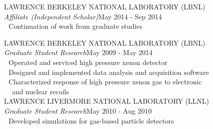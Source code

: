\indent\hspace{0.2 cm}LAWRENCE BERKELEY NATIONAL LABORATORY (LBNL)\\
\indent\hspace{0.2 cm}\hspace{0.6 cm}\emph{Affiliate (Independent Scholar)}\hspace{6.6 cm}May 2014 - Sep 2014\\
\indent\hspace{0.2 cm}\hspace{0.6 cm}\hspace{0.6 cm}\textbullet\,\, Continuation of work from graduate studies\\

\newpage

\indent\hspace{0.2 cm}LAWRENCE BERKELEY NATIONAL LABORATORY (LBNL)\\
\indent\hspace{0.2 cm}\hspace{0.6 cm}\emph{Graduate Student Research}\hspace{7.1 cm}May 2009 - May 2014\\
\indent\hspace{0.2 cm}\hspace{0.6 cm}\hspace{0.6 cm}\textbullet\,\, Operated and serviced high pressure xenon detector\\
\indent\hspace{0.2 cm}\hspace{0.6 cm}\hspace{0.6 cm}\textbullet\,\, Designed and implemented data analysis and acquisition software\\
\indent\hspace{0.2 cm}\hspace{0.6 cm}\hspace{0.6 cm}\textbullet\,\, Characterized response of high pressure xenon gas to electronic\\
\indent\hspace{0.2 cm}\hspace{0.6 cm}\hspace{0.6 cm}\,\,\,\,\,\,\,and nuclear recoils\\

\indent\hspace{0.2 cm}LAWRENCE LIVERMORE NATIONAL LABORATORY (LLNL)\\
\indent\hspace{0.2 cm}\hspace{0.6 cm}\emph{Graduate Student Research}\hspace{7.1 cm}May 2010 - Aug 2010\\
\indent\hspace{0.2 cm}\hspace{0.6 cm}\hspace{0.6 cm}\textbullet\,\, Developed simulations for gas-based particle detectors\\

